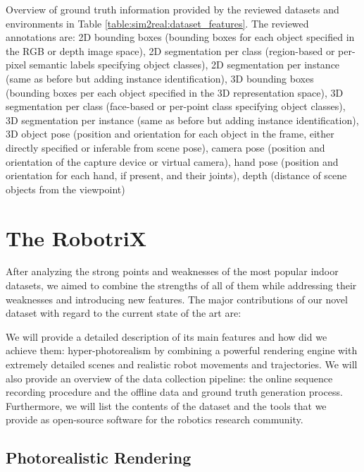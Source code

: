 \begin{table}[!b]
    \caption{Overview of ground truth information provided by the reviewed datasets and environments in Table \ref{table:sim2real:dataset_features}. The reviewed annotations are: 2D bounding boxes (bounding boxes for each object specified in the RGB or depth image space), 2D segmentation per class (region-based or per-pixel semantic labels specifying object classes), 2D segmentation per instance (same as before but adding instance identification), 3D bounding boxes (bounding boxes per each object specified in the 3D representation space), 3D segmentation per class (face-based or per-point class specifying object classes), 3D segmentation per instance (same as before but adding instance identification), 3D object pose (position and orientation for each object in the frame, either directly specified or inferable from scene pose), camera pose (position and orientation of the capture device or virtual camera), hand pose (position and orientation for each hand, if present, and their joints), depth (distance of scene objects from the viewpoint)}
    \label{table:dataset_ground_truth}
  \end{table}

\clearpage

\section{The RobotriX}
\label{cha:sim2real:sec:proposal}

After analyzing the strong points and weaknesses of the most popular indoor datasets, we aimed to combine the strengths of all of them while addressing their weaknesses and introducing new features. The major contributions of our novel dataset with regard to the current state of the art are:



We will provide a detailed description of its main features and how did we achieve them: hyper-photorealism by combining a powerful rendering engine with extremely detailed scenes and realistic robot movements and trajectories. We will also provide an overview of the data collection pipeline: the online sequence recording procedure and the offline data and ground truth generation process. Furthermore, we will list the contents of the dataset and the tools that we provide as open-source software for the robotics research community.

\subsection{Photorealistic Rendering}

